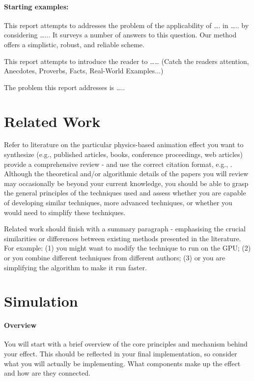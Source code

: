 \documentclass[conference,backref=page]{acmsiggraph}
\begin{document}
\paragraph{Starting examples:}
This report attempts to addresses the problem of the applicability of …. in ….. by considering …...  It surveys a number of answers to this question.  Our method offers a simplistic, robust, and reliable scheme.

This report attempts to introduce the reader to …… 
(Catch the readers attention, Anecdotes, Proverbs, Facts, Real-World Examples...)

The problem this report addresses is …..


\section{Related Work}
Refer to literature on the particular physics-based animation effect you want to synthesize (e.g., published articles, books, conference proceedings, web articles) provide a comprehensive review - and use the correct citation format, e.g., \cite{Sako00}. Although the theoretical and/or algorithmic details of the papers you will review may occasionally be beyond your current knowledge, you should be able to grasp the general principles of the techniques used and assess whether you are capable of developing similar techniques, more advanced techniques, or whether you would need to simplify these techniques. 



Related work should finish with a summary paragraph - emphasising the crucial similarities or differences between existing methods presented in the literature.  For example: (1) you might want to modify the technique to run on the GPU; (2) or you combine different techniques from different authors; (3) or you are simplifying the algorithm to make it run faster.

\section{Simulation}

\paragraph{Overview}
You will start with a brief overview of the core principles and mechanism behind your effect.  This should be reflected in your final implementation, so consider what you will actually be implementing. What components make up the effect and how are they connected.
\end{document}
